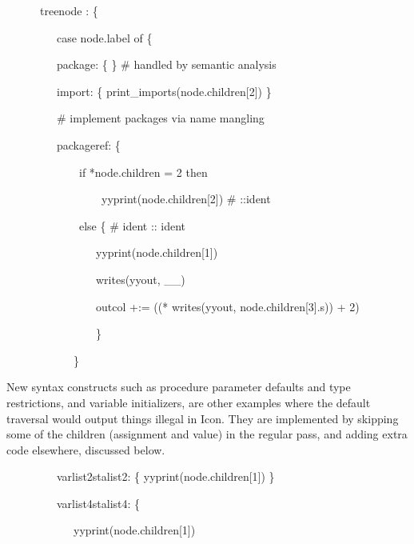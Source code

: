 {\ttfamily\mdseries
\ \ \ \ \ \ {\textquotedbl}treenode{\textquotedbl} : \{}

{\ttfamily\mdseries
\ \ \ \ \ \ \ \ \ case node.label of \{}

{\ttfamily\mdseries
\ \ \ \ \ \ \ \ \ {\textquotedbl}package{\textquotedbl}: \{ \} \# handled by semantic analysis}

{\ttfamily\mdseries
\ \ \ \ \ \ \ \ \ {\textquotedbl}import{\textquotedbl}: \{ print\_imports(node.children[2]) \}}

{\ttfamily\mdseries
\ \ \ \ \ \ \ \ \ \# implement packages via name mangling}

{\ttfamily\mdseries
\ \ \ \ \ \ \ \ \ {\textquotedbl}packageref{\textquotedbl}: \{}

{\ttfamily\mdseries
\ \ \ \ \ \ \ \ \ \ \ \ \ if *node.children = 2 then}

{\ttfamily\mdseries
\ \ \ \ \ \ \ \ \ \ \ \ \ \ \ \ \ yyprint(node.children[2]) \# ::ident}

{\ttfamily\mdseries
\ \ \ \ \ \ \ \ \ \ \ \ \ else \{ \# ident :: ident}

{\ttfamily\mdseries
\ \ \ \ \ \ \ \ \ \ \ \ \ \ \ \ yyprint(node.children[1])}

{\ttfamily\mdseries
\ \ \ \ \ \ \ \ \ \ \ \ \ \ \ \ writes(yyout, {\textquotedbl}\_\_{\textquotedbl})}

{\ttfamily\mdseries
\ \ \ \ \ \ \ \ \ \ \ \ \ \ \ \ outcol +:= ((* writes(yyout, node.children[3].s)) + 2)}

{\ttfamily\mdseries
\ \ \ \ \ \ \ \ \ \ \ \ \ \ \ \ \}}

{\ttfamily\mdseries
\ \ \ \ \ \ \ \ \ \ \ \ \}}


New syntax constructs such as procedure parameter defaults and type
restrictions, and variable initializers, are other examples where the
default traversal would output things illegal in Icon. They are
implemented by skipping some of the children (assignment and value) in
the regular pass, and adding extra code elsewhere, discussed below.

{\ttfamily\mdseries
\ \ \ \ \ \ \ \ \ {\textquotedbl}varlist2{\textquotedbl}{\textbar}{\textquotedbl}stalist2{\textquotedbl}: \{
yyprint(node.children[1]) \}}

{\ttfamily\mdseries
\ \ \ \ \ \ \ \ \ {\textquotedbl}varlist4{\textquotedbl}{\textbar}{\textquotedbl}stalist4{\textquotedbl}: \{}

{\ttfamily\mdseries
\ \ \ \ \ \ \ \ \ \ \ \ yyprint(node.children[1])}

